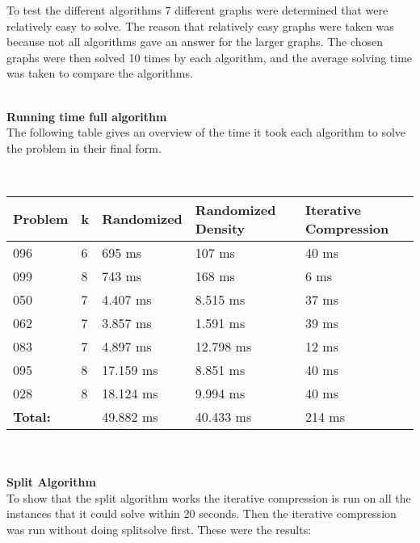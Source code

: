 To test the different algorithms 7 different graphs were determined that were relatively easy to solve. The reason that relatively easy graphs were taken was because not all algorithms gave an answer for the larger graphs. The chosen graphs were then solved 10 times by each algorithm, and the average solving time was taken to compare the algorithms. 

~\\\textbf{Running time full algorithm} \\
The following table gives an overview of the time it took each algorithm to solve the problem in their final form.

~\\\begin{tabular}{|l|l|l|l|l|}
\hline
\textbf{Problem} & \textbf{k} & \textbf{Randomized} & \textbf{Randomized Density} & \textbf{Iterative Compression} \\
\hline
096 & 6 & 695 ms & 107 ms & 40 ms \\
099 & 8 & 743 ms & 168 ms & 6 ms \\
050 & 7 & 4.407 ms & 8.515 ms & 37 ms \\
062 & 7 & 3.857 ms & 1.591 ms & 39 ms \\
083 & 7 & 4.897 ms & 12.798 ms & 12 ms \\
095 & 8 & 17.159 ms & 8.851 ms& 40 ms \\
028 & 8 & 18.124 ms & 9.994 ms& 40 ms \\
\hline
\textbf{Total:} & & 49.882 ms & 40.433 ms & 214 ms\\
\hline
\end{tabular}

~\\\\\textbf{Split Algorithm} \\
To show that the split algorithm works the iterative compression is run on all the instances that it could solve within 20 seconds. Then the iterative compression was run without doing splitsolve first. These were the results:

